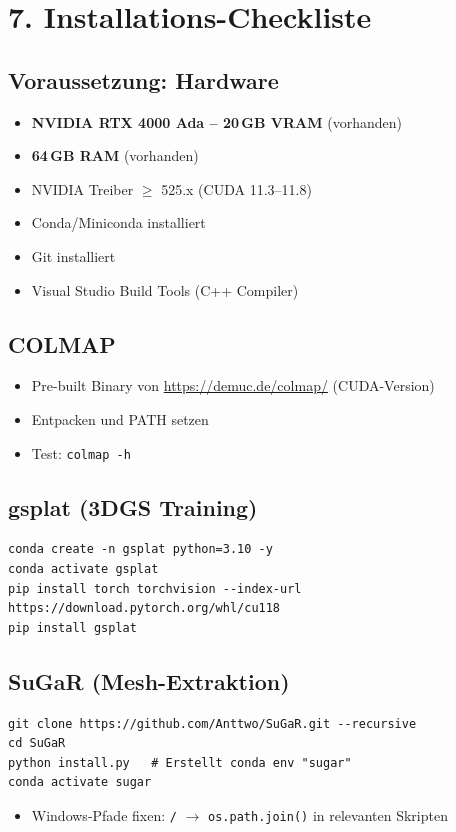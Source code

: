 \documentclass[11pt, a4paper]{article}
\begin{document}
\section{7. Installations-Checkliste}

\subsection{Voraussetzung: Hardware}
\begin{itemize}[noitemsep]
    \item[$\checkmark$] \textbf{NVIDIA RTX 4000 Ada -- 20\,GB VRAM} (vorhanden)
    \item[$\checkmark$] \textbf{64\,GB RAM} (vorhanden)
    \item[$\square$] NVIDIA Treiber $\geq$ 525.x (CUDA 11.3--11.8)
    \item[$\square$] Conda/Miniconda installiert
    \item[$\square$] Git installiert
    \item[$\square$] Visual Studio Build Tools (C++ Compiler)
\end{itemize}

\subsection{COLMAP}
\begin{itemize}[noitemsep]
    \item[$\square$] Pre-built Binary von \url{https://demuc.de/colmap/} (CUDA-Version)
    \item[$\square$] Entpacken und PATH setzen
    \item[$\square$] Test: \texttt{colmap -h}
\end{itemize}

\subsection{gsplat (3DGS Training)}
\begin{lstlisting}
conda create -n gsplat python=3.10 -y
conda activate gsplat
pip install torch torchvision --index-url https://download.pytorch.org/whl/cu118
pip install gsplat
\end{lstlisting}

\subsection{SuGaR (Mesh-Extraktion)}
\begin{lstlisting}
git clone https://github.com/Anttwo/SuGaR.git --recursive
cd SuGaR
python install.py   # Erstellt conda env "sugar"
conda activate sugar
\end{lstlisting}
\begin{itemize}[noitemsep]
    \item[$\square$] Windows-Pfade fixen: \texttt{/} $\rightarrow$ \texttt{os.path.join()} in relevanten Skripten
\end{itemize}
\end{document}
